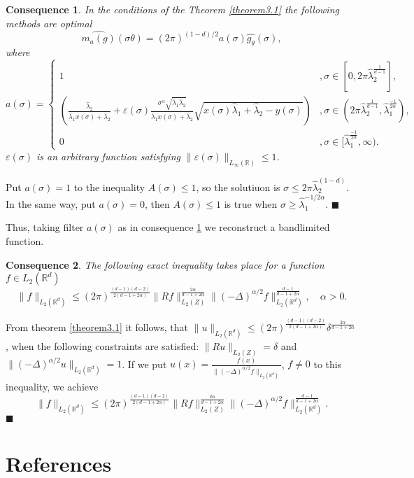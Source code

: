 \documentclass[12pt]{iopart}
\newtheorem{conseq}{Consequence}
\newenvironment{proof}
{\par\noindent{\bf Proof}}
{\hfill$\scriptstyle\blacksquare$}
\begin{document}
\begin{conseq}
\label{cons3.1}
In the conditions of the Theorem \ref{theorem3.1} the following methods are optimal $$
\widehat{m_a(g)}(\sigma\theta
)=(2\pi)^{(1-d)/2}a(\sigma)\widehat{g_\theta }(\sigma), $$ where
  \[
a(\sigma)=
  \begin{cases}
    1& ,\sigma\in [0,2\pi\widehat\lambda_2^\frac{1}{d-1}],\\
    \left(\frac{\widehat\lambda_2}{\widehat\lambda_1x(\sigma)+\widehat\lambda_2}+\varepsilon(\sigma)\frac{\sigma^\alpha\sqrt{\widehat\lambda_1\widehat\lambda_2}}{\widehat\lambda_1x(\sigma)+\widehat\lambda_2}\sqrt{x(\sigma)\widehat\lambda_1+\widehat\lambda_2-y(\sigma)}\right)& ,\sigma\in (2\pi\widehat\lambda_2^\frac{1}{d-1},\widehat\lambda_1^{\frac{-1}{2\alpha}}),\\
    0 &,\sigma\in [\widehat\lambda_1^{\frac{-1}{2\alpha}},\infty).
  \end{cases}
\]
$\varepsilon(\sigma)$ is an arbitrary function satisfying $\|\varepsilon(\sigma)\|_{L_\infty(\mathbb R)}\le 1$.
\end{conseq}

\begin{proof}
Put $a(\sigma)=1$ to the inequality $A(\sigma)\leqslant 1$, so the solutiuon is $\sigma\leqslant
  2\pi\widehat\lambda_2^{(1-d)}$. In the same way, put $a(\sigma)=0$,
  then $A(\sigma)\leqslant 1$ is true when $\sigma\geqslant
  \widehat\lambda_1^{-1/{2\alpha}}$.
\end{proof}

 Thus, taking filter $a(\sigma)$ as in consequence \ref{cons3.1} we reconstruct a bandlimited function.


\begin{conseq}
\label{cons3.2}
The following exact inequality takes place for a function $f\in L_2(\mathbb R^d)$
\[
\|f\|_{L_2(\mathbb R^d)}\leqslant
(2\pi)^{\frac{(d-1)(d-2)}{2(d-1+2\alpha)}}\|Rf\|_{L_2(Z)}^{\frac{2\alpha}{d-1+2\alpha}}\|(-\Delta)^{\alpha/2}f\|_{L_2(\mathbb
  R^d)}^\frac{d-1}{d-1+2\alpha},\quad\alpha>0.
\]
\end{conseq}

\begin{proof}
From theorem \ref{theorem3.1} it follows, that \linebreak
 $\|u\|_{L_2(\mathbb R^d)}\leqslant
  (2\pi)^{\frac{(d-1)(d-2)}{2(d-1+2\alpha)}}\delta^{\frac{2\alpha}{d-1+2\alpha}}$, 
  when the following constraints are satisfied: $\|Ru\|_{L_2(Z)}=\delta$ and
  $\|(-\Delta)^{\alpha/2}u\|_{L_2(\mathbb R^d)}=1$. If we put
 $u(x)=\frac{f(x)}{\|(-\Delta)^{\alpha/2}f\|_{L_2(\mathbb R^d)}}$, $f\ne 0$ to this inequality, we achieve
\[
\|f\|_{L_2(\mathbb R^d)}\leqslant
(2\pi)^{\frac{(d-1)(d-2)}{2(d-1+2\alpha)}}\|Rf\|_{L_2(Z)}^{\frac{2\alpha}{d-1+2\alpha}}\|(-\Delta)^{\alpha/2}f\|_{L_2(\mathbb
  R^d)}^\frac{d-1}{d-1+2\alpha}.
\]
\end{proof}



\section*{References}


\end{document}
